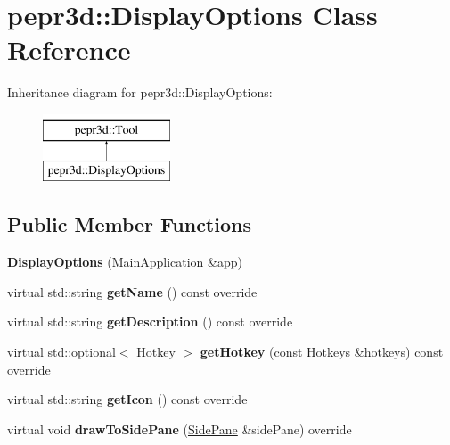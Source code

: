 \hypertarget{classpepr3d_1_1_display_options}{}\section{pepr3d\+::Display\+Options Class Reference}
\label{classpepr3d_1_1_display_options}
Inheritance diagram for pepr3d\+::Display\+Options\+:\begin{figure}[H]
\begin{center}
\leavevmode
\includegraphics[height=2.000000cm]{classpepr3d_1_1_display_options}
\end{center}
\end{figure}
\subsection*{Public Member Functions}
\begin{DoxyCompactItemize}
\item 
\mbox{\label{classpepr3d_1_1_display_options_a139425e33e4e1ba7b85aae7ea288e926}} 
{\bfseries Display\+Options} (\mbox{\hyperlink{classpepr3d_1_1_main_application}{Main\+Application}} \&app)
\item 
\mbox{\label{classpepr3d_1_1_display_options_aa743b8c99fcabb4603c1d8c3357020f6}} 
virtual std\+::string {\bfseries get\+Name} () const override
\item 
\mbox{\label{classpepr3d_1_1_display_options_aa68e8ddd00436caf8f3b5d4cab81f4cd}} 
virtual std\+::string {\bfseries get\+Description} () const override
\item 
\mbox{\label{classpepr3d_1_1_display_options_ad81f1aa914b4b7f513d4d01995c4d60e}} 
virtual std\+::optional$<$ \mbox{\hyperlink{structpepr3d_1_1_hotkey}{Hotkey}} $>$ {\bfseries get\+Hotkey} (const \mbox{\hyperlink{classpepr3d_1_1_hotkeys}{Hotkeys}} \&hotkeys) const override
\item 
\mbox{\label{classpepr3d_1_1_display_options_a8f1a481272d7ebcc96c32937027be68c}} 
virtual std\+::string {\bfseries get\+Icon} () const override
\item 
\mbox{\label{classpepr3d_1_1_display_options_a403d402fdd5fdfcdcc24a206b9f1ef66}} 
virtual void {\bfseries draw\+To\+Side\+Pane} (\mbox{\hyperlink{classpepr3d_1_1_side_pane}{Side\+Pane}} \&side\+Pane) override
\end{DoxyCompactItemize}
